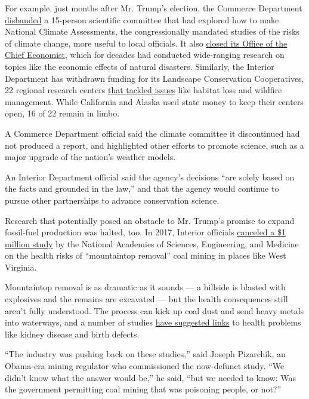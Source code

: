 For example, just months after Mr. Trump's election, the Commerce
Department
\href{https://www.washingtonpost.com/news/energy-environment/wp/2017/08/20/the-trump-administration-just-disbanded-a-federal-advisory-committee-on-climate-change/}{disbanded}
a 15-person scientific committee that had explored how to make National
Climate Assessments, the congressionally mandated studies of the risks
of climate change, more useful to local officials. It also
\href{http://www.osec.doc.gov/opog/dmp/revocations/doo35_7.html}{closed
its Office of the Chief Economist}, which for decades had conducted
wide-ranging research on topics like the economic effects of natural
disasters. Similarly, the Interior Department has withdrawn funding for
its Landscape Conservation Cooperatives, 22 regional research centers
\href{https://www.nap.edu/read/21829/chapter/8}{that tackled issues}
like habitat loss and wildfire management. While California and Alaska
used state money to keep their centers open, 16 of 22 remain in limbo.

A Commerce Department official said the climate committee it
discontinued had not produced a report, and highlighted other efforts to
promote science, such as a major upgrade of the nation's weather models.

An Interior Department official said the agency's decisions ``are solely
based on the facts and grounded in the law,'' and that the agency would
continue to pursue other partnerships to advance conservation science.

Research that potentially posed an obstacle to Mr. Trump's promise to
expand fossil-fuel production was halted, too. In 2017, Interior
officials
\href{https://www.nytimes3xbfgragh.onion/2017/08/21/climate/coal-mining-health-study-is-halted-by-interior-department.html}{canceled
a \$1 million study} by the National Academies of Sciences, Engineering,
and Medicine on the health risks of ``mountaintop removal'' coal mining
in places like West Virginia.

Mountaintop removal is as dramatic as it sounds --- a hillside is
blasted with explosives and the remains are excavated --- but the health
consequences still aren't fully understood. The process can kick up coal
dust and send heavy metals into waterways, and a number of studies
\href{https://www.ncbi.nlm.nih.gov/pubmed/28738262}{have suggested
links} to health problems like kidney disease and birth defects.

``The industry was pushing back on these studies,'' said Joseph
Pizarchik, an Obama-era mining regulator who commissioned the
now-defunct study. ``We didn't know what the answer would be,'' he said,
``but we needed to know: Was the government permitting coal mining that
was poisoning people, or not?''

